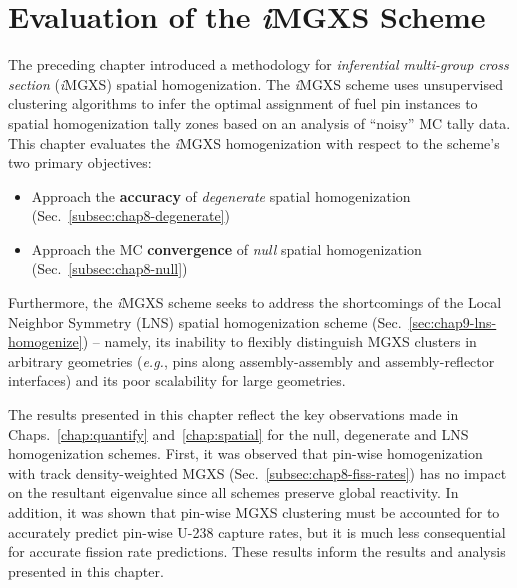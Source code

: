 \chapter{Evaluation of the \textit{i}MGXS Scheme}
\label{chap:results}

The preceding chapter introduced a methodology for \textit{inferential multi-group cross section} (\textit{i}\ac{MGXS}) spatial homogenization. The \textit{i}\ac{MGXS} scheme uses unsupervised clustering algorithms to infer the optimal assignment of fuel pin instances to spatial homogenization tally zones based on an analysis of ``noisy'' \ac{MC} tally data. This chapter evaluates the \textit{i}\ac{MGXS} homogenization with respect to the scheme's two primary objectives:

\begin{itemize}[noitemsep]
\item Approach the \textbf{accuracy} of \textit{degenerate} spatial homogenization (Sec.~\ref{subsec:chap8-degenerate})
\item Approach the \ac{MC} \textbf{convergence} of \textit{null} spatial homogenization (Sec.~\ref{subsec:chap8-null})
\end{itemize}

\noindent Furthermore, the \textit{i}\ac{MGXS} scheme seeks to address the shortcomings of the Local Neighbor Symmetry (\ac{LNS}) spatial homogenization scheme (Sec.~\ref{sec:chap9-lns-homogenize}) -- namely, its inability to flexibly distinguish \ac{MGXS} clusters in arbitrary geometries (\textit{e.g.}, pins along assembly-assembly and assembly-reflector interfaces) and its poor scalability for large geometries.

The results presented in this chapter reflect the key observations made in Chaps.~\ref{chap:quantify} and~\ref{chap:spatial} for the null, degenerate and \ac{LNS} homogenization schemes. First, it was observed that pin-wise homogenization with track density-weighted \ac{MGXS} (Sec.~\ref{subsec:chap8-fiss-rates}) has no impact on the resultant eigenvalue since all schemes preserve global reactivity. In addition, it was shown that pin-wise \ac{MGXS} clustering must be accounted for to accurately predict pin-wise U-238 capture rates, but it is much less consequential for accurate fission rate predictions. These results inform the results and analysis presented in this chapter.

